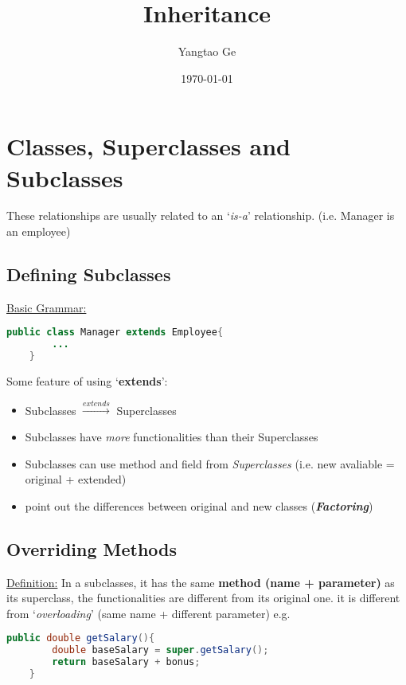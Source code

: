 \documentclass[12pt]{article}
\title{Inheritance}
\author{Yangtao Ge}
\date{\today}
\begin{document}
\maketitle

\section{Classes, Superclasses and Subclasses}
These relationships are usually related to an `\textit{is-a}' relationship.
(i.e. Manager is an employee)

\subsection{Defining Subclasses}
\underline{Basic Grammar:}
\begin{lstlisting}[language=Java]
    public class Manager extends Employee{
        ... 
    }
\end{lstlisting}

Some feature of using `\textbf{extends}':
\begin{itemize}
    \item Subclasses $\xrightarrow{extends}$ Superclasses
    \item Subclasses have \emph{more} functionalities than their Superclasses
    \item Subclasses can use method and field from \textit{Superclasses} \newline
    (i.e. new avaliable = original + extended)
    \item point out the differences between original and new classes (\emph{\textbf{Factoring}})
\end{itemize}

\subsection{Overriding Methods}
\underline{Definition:} In a subclasses, it has the same \textbf{method (name + parameter)} as its superclass,
the functionalities are different from its original one. \newline
it is different from `\textit{overloading}' (same name + different parameter) \newline
e.g.
\begin{lstlisting}[language=Java]
    public double getSalary(){
        double baseSalary = super.getSalary();
        return baseSalary + bonus;
    }
\end{lstlisting}
\end{document}
